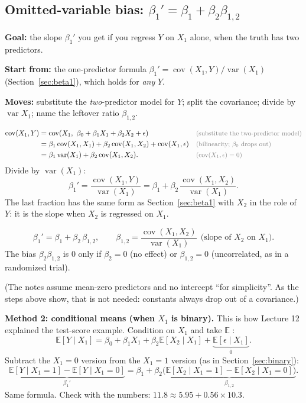 \documentclass[11pt]{article}
\newcommand{\E}{\mathbb{E}}
\newcommand{\Var}{\operatorname{var}}
\newcommand{\Cov}{\operatorname{cov}}
\newcommand{\given}{\mid}
\newcommand{\why}[1]{&&\text{\small\color{gray}(#1)}}
\newcommand{\mv}[1]{\tcbox[on line, colback=methodclr, colframe=methodclr, coltext=white, boxsep=0pt,
  left=2pt, right=2pt, top=1pt, bottom=1pt, arc=1.5pt]{\sffamily\scriptsize\bfseries M#1}}
\newcommand{\goal}[1]{\textbf{Goal:} #1\par}
\newcommand{\start}[1]{\textbf{Start from:} #1\par}
\newcommand{\moves}[1]{\textbf{Moves:} #1\par}
\begin{document}
\subsection{Omitted-variable bias: $\beta_1'=\beta_1+\beta_2\beta_{1,2}$}\label{sec:ovb}
\begin{methodbox}
\goal{the slope $\beta_1'$ you get if you regress $Y$ on $X_1$ alone, when the truth has two predictors.}
\start{the one-predictor formula $\beta_1'=\Cov(X_1,Y)/\Var(X_1)$ (Section~\ref{sec:beta1}), which holds for \emph{any} $Y$.}
\moves{\mv{1} substitute the \emph{two}-predictor model for $Y$; \mv{3} split the covariance; divide by $\Var X_1$; name the leftover ratio $\beta_{1,2}$.}
\end{methodbox}
\begin{align*}
\Cov(X_1,Y)&=\Cov(X_1,\ \beta_0+\beta_1X_1+\beta_2X_2+\epsilon) \why{substitute the two-predictor model}\\
&=\beta_1\Cov(X_1,X_1)+\beta_2\Cov(X_1,X_2)+\Cov(X_1,\epsilon) \why{bilinearity; $\beta_0$ drops out}\\
&=\beta_1\Var(X_1)+\beta_2\Cov(X_1,X_2). \why{$\Cov(X_1,\epsilon)=0$}
\end{align*}
Divide by $\Var(X_1)$:
\[
\beta_1'=\frac{\Cov(X_1,Y)}{\Var(X_1)}=\beta_1+\beta_2\,\frac{\Cov(X_1,X_2)}{\Var(X_1)} .
\]
The last fraction has the same form as Section~\ref{sec:beta1} with $X_2$ in the role of $Y$: it is the slope when $X_2$ is regressed on $X_1$.
\begin{keybox}[title={Omitted-variable bias}]
\[
\beta_1'=\beta_1+\beta_2\,\beta_{1,2},\qquad \beta_{1,2}=\frac{\Cov(X_1,X_2)}{\Var(X_1)}\ \ \text{(slope of $X_2$ on $X_1$)}.
\]
The bias $\beta_2\beta_{1,2}$ is $0$ only if $\beta_2=0$ (no effect) or $\beta_{1,2}=0$ (uncorrelated, as in a randomized trial).
\end{keybox}
(The notes assume mean-zero predictors and no intercept ``for simplicity''. As the steps above show, that is not needed: constants
always drop out of a covariance.)

\textbf{Method 2: conditional means (when $X_1$ is binary).} This is how Lecture 12 explained the test-score example. Condition on $X_1$ \mv{5}
and take $\E$ \mv{2}:
\[
\E[Y\given X_1]=\beta_0+\beta_1X_1+\beta_2\E[X_2\given X_1]+\underbrace{\E[\epsilon\given X_1]}_{0}.
\]
Subtract the $X_1=0$ version from the $X_1=1$ version (as in Section~\ref{sec:binary}):
\[
\underbrace{\E[Y\given X_1{=}1]-\E[Y\given X_1{=}0]}_{\beta_1'}=\beta_1+\beta_2\underbrace{\big(\E[X_2\given X_1{=}1]-\E[X_2\given X_1{=}0]\big)}_{\beta_{1,2}} .
\]
Same formula. Check with the numbers: $11.8\approx5.95+0.56\times10.3$.
\end{document}
